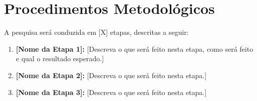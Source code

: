 %
%
%
%



\section{Procedimentos Metodológicos}


A pesquisa será conduzida em [X] etapas, descritas a seguir:

\begin{enumerate}

  \item \textbf{[Nome da Etapa 1]:}
    [Descreva o que será feito nesta etapa, como será feito
    e qual o resultado esperado.]

  \item \textbf{[Nome da Etapa 2]:}
    [Descreva o que será feito nesta etapa.]

  \item \textbf{[Nome da Etapa 3]:}
    [Descreva o que será feito nesta etapa.]


\end{enumerate}

